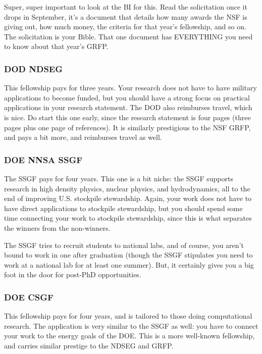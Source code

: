 \documentclass[12pt]{article}
\begin{document}
Super, super important to look at the BI for this. Read the solicitation once it drops in September, it’s a document that details how many awards the NSF is giving out, how much money, the criteria for that year’s fellowship, and so on. The solicitation is your Bible. That one document has EVERYTHING you need to know about that year’s GRFP.

\subsubsection{DOD NDSEG}

This fellowship pays for three years. Your research does not have to have military applications to become funded, but you should have a strong focus on practical applications in your research statement. The DOD also reimburses travel, which is nice. Do start this one early, since the research statement is four pages (three pages plus one page of references). It is similarly prestigious to the NSF GRFP, and pays a bit more, and reimburses travel as well.

\subsubsection{DOE NNSA SSGF}

The SSGF pays for four years. This one is a bit niche: the SSGF supports research in high density physics, nuclear physics, and hydrodynamics, all to the end of improving U.S. stockpile stewardship. Again, your work does not have to have direct applications to stockpile stewardship, but you should spend some time connecting your work to stockpile stewardship, since this is what separates the winners from the non-winners. 

The SSGF tries to recruit students to national labs, and of course, you aren't bound to work in one after  graduation (though the SSGF stipulates you need to work at a national lab for at least one summer). But, it certainly gives you a big foot in the door for post-PhD opportunities.

\subsubsection{DOE CSGF}

This fellowship pays for four years, and is tailored to those doing computational research. The application is very similar to the SSGF as well: you have to connect your work to the energy goals of the DOE. This is a more well-known fellowship, and carries similar prestige to the NDSEG and GRFP.
\end{document}
